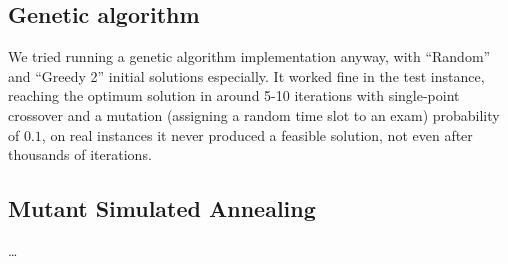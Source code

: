 \documentclass[11pt, a4paper, leqno]{article}
\begin{document}
	\subsection{Genetic algorithm}
	
	We tried running a genetic algorithm implementation anyway, with ``Random'' and ``Greedy 2'' initial solutions especially. It worked fine in the test instance, reaching the optimum solution in around 5-10 iterations with single-point crossover and a mutation (assigning a random time slot to an exam) probability of $0.1$, on real instances it never produced a feasible solution, not even after thousands of iterations.
	
	\subsection{Mutant Simulated Annealing\texttrademark}
	
	\dots
	
\end{document}
